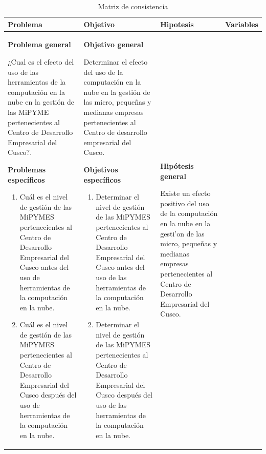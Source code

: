 \begin{table}
\centering
\caption{Matriz de consistencia}
\label{t:consistencia}
\begin{tabular}{|p{5cm}|p{6cm}|p{6cm}|p{4cm}|}
\hline
Problema & Objetivo & Hipotesis & Variables \\ \hline
\textbf{Problema general}

¿Cual es el efecto del uso de las herramientas de la computación en la nube
en la gestión de las MiPYME pertenecientes al Centro de Desarrollo Empresarial
del Cusco?.

\textbf{Problemas específicos}

\begin{enumerate}[noitemsep]
\item Cuál es el nivel de gestión de las MiPYMES pertenecientes al Centro
de Desarrollo Empresarial del Cusco antes del uso de herramientas de la computación
en la nube.
\item Cuál es el nivel de gestión de las MiPYMES pertenecientes al Centro
de Desarrollo Empresarial del Cusco después del uso de herramientas de la computación
en la nube.
\end{enumerate}
&
\textbf{Objetivo general}

Determinar el efecto del uso de la computación en la nube en la gestión de
las micro, pequeñas y medianas empresas pertenecientes al Centro de desarrollo
empresarial del Cusco.

\textbf{Objetivos específicos}
\begin{enumerate}
  \item Determinar el nivel de gestión de las MiPYMES pertenecientes al Centro de
  Desarrollo Empresarial del Cusco antes del uso de las herramientas de la
  computación en la nube.
  \item Determinar el nivel de gestión de las MiPYMES pertenecientes al Centro de
  Desarrollo Empresarial del Cusco después del uso de las herramientas de la
  computación en la nube.
\end{enumerate}
&
\textbf{Hipótesis general}

Existe un efecto positivo del uso de la computación en la nube en la
gesti'on de las micro, pequeñas y medianas empresas pertenecientes al Centro de
Desarrollo Empresarial del Cusco.


\end{tabular}
\end{table}
